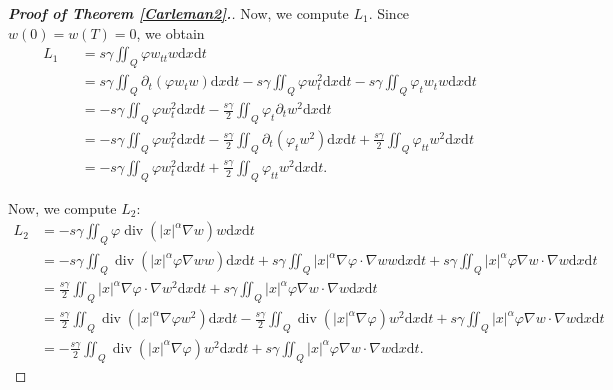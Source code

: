 \documentclass[10pt,a4paper]{amsart}
\DeclareMathOperator{\Div}{div}
\def\al{\alpha}
\def\bf{\textbf}
\def\df{\mathrm d}
\def\f{\frac}
\def\ga{\gamma}
\def\pt{\partial}
\def\vp{\varphi}
\begin{document}
\begin{proof}[{\rm \bf { Proof of  Theorem \ref{Carleman2}.}}]
			
			Now, we compute $L_1$. Since $w(0)=w(T)=0$, we obtain
			\begin{eqnarray*}
				L_1
				&&=s\ga \iint_Q \vp w_{tt} w\df x\df t\\
				&&=s\ga\iint_Q \pt_t(\vp w_tw)\df x\df t-s\ga\iint_Q \vp w_t^2\df x\df t-s\ga \iint_Q\vp_tw_tw\df x\df t\\
				&&=-s\ga\iint_Q\vp w_t^2\df x\df t -\f{s\ga }{2}\iint_Q\vp_t\pt_tw^2\df x\df t\\
				&&=-s\ga\iint_Q\vp w_t^2\df x\df t-\f{s\ga }{2}\iint_Q \pt_t(\vp_tw^2)\df x\df t+\f{s\ga }{2}\iint_Q \vp_{tt}w^2\df x\df t\\
				&&=-s\ga\iint_Q\vp w_t^2\df x\df t+\f{s\ga }{2}\iint_Q \vp_{tt}w^2\df x\df t.
			\end{eqnarray*}
			
			
			
			Now, we compute $L_2$:
			\begin{equation*}
				\begin{split}
					L_2
					&=-s\ga \iint_Q \vp \Div(|x|^\al \nabla w)w\df x\df t\\
					&=-s\ga \iint_Q\Div\left(|x|^\al \vp \nabla w w\right)\df x\df t+s\ga\iint_Q|x|^\al \nabla\vp\cdot \nabla w w\df x\df t+s\ga\iint_Q|x|^\al \vp \nabla w\cdot \nabla w\df x\df t\\
					&=\f{s\ga}{2}\iint_Q|x|^\al \nabla \vp\cdot \nabla w^2\df x\df t+s\ga \iint_Q|x|^\al \vp\nabla w\cdot \nabla w\df x\df t\\
					&=\f{s\ga}{2}\iint_Q\Div\left(|x|^\al \nabla \vp w^2\right)\df x\df t-\f{s\ga}{2}\iint_Q\Div\left(|x|^\al \nabla \vp\right)w^2\df x\df t+s\ga\iint_Q|x|^\al \vp \nabla w\cdot \nabla w\df x\df t\\
					&=-\f{s\ga}{2}\iint_Q\Div\left(|x|^\al \nabla \vp\right)w^2\df x\df t+s\ga\iint_Q|x|^\al \vp \nabla w\cdot \nabla w\df x\df t.
				\end{split}
			\end{equation*}
			

\end{proof}
\end{document}
